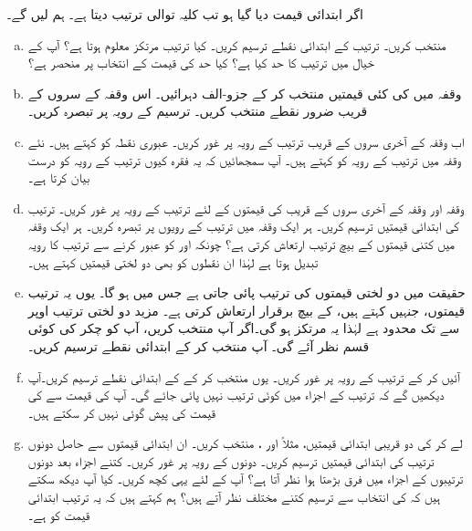 اگر ابتدائی قیمت  دیا گیا ہو تب کلیہ توالی  ترتیب  دیتا ہے۔  ہم  لیں گے۔
\begin{enumerate}[a.]
\item
{} منتخب کریں۔ ترتیب کے ابتدائی  نقطے  ترسیم کریں۔ کیا ترتیب مرتکز  معلوم ہوتا ہے؟ آپ کے خیال میں ترتیب کا حد کیا ہے؟ کیا حد کی قیمت  کے انتخاب پر منحصر ہے؟
\item
وقفہ  میں  کی کئی قیمتیں منتخب کر کے جزو-الف دہرائیں۔ اس وقفہ کے سروں کے قریب ضرور نقطے منتخب کریں۔ ترسیم کے رویہ پر تبصرہ کریں۔
\item
اب وقفہ  کے آخری سروں کے قریب ترتیب کے رویہ پر غور کریں۔ عبوری نقطہ  کو   کہتے ہیں۔ نئے وقفہ میں ترتیب کے رویہ کو   کہتے ہیں۔ آپ سمجھائیں کہ یہ فقرہ کیوں ترتیب کے رویہ کو درست بیان کرتا ہے۔
\item
وقفہ  اور وقفہ  کے آخری سروں کے قریب   کی قیمتوں کے لئے ترتیب کے رویہ پر غور کریں۔ ترتیب کی ابتدائی  قیمتیں ترسیم کریں۔ ہر ایک وقفہ میں ترتیب کے رویوں پر تبصرہ کریں۔ ہر ایک وقفہ میں کتنی قیمتوں کے بیچ ترتیب  ارتعاش کرتی ہے؟ چونکہ   اور  کو عبور کرنے سے ترتیب کا رویہ تبدیل ہوتا ہے لہٰذا ان نقطوں کو بھی دو لختی قیمتیں کہتے ہیں۔ 
\item
حقیقت میں دو لختی قیمتوں کی ترتیب  پائی جاتی ہے جس میں  ہو گا۔ یوں یہ ترتیب  قیمتوں، جنہیں  کہتے ہیں، کے بیچ برقرار ارتعاش کرتی ہے۔ مزید دو لختی ترتیب  اوپر سے  تک محدود ہے لہٰذا یہ مرتکز ہو گی۔اگر آپ  منتخب کریں، آپ کو  چکر کی کوئی قسم نظر آئے گی۔ آپ  منتخب کر کے ابتدائی  نقطے ترسیم کریں۔
\item
آئیں  کر کے ترتیب کے رویہ پر غور کریں۔ یوں  منتخب کر کے  کے ابتدائی  نقطے ترسیم کریں۔آپ دیکھیں گے کہ ترتیب کے اجزاء میں کوئی ترتیب نہیں پائی جائے گی۔ آپ  کی قیمت سے  کی قیمت کی پیش گوئی نہیں کر سکتے ہیں۔
\item
{} لے کر  کی دو قریبی ابتدائی قیمتیں، مثلاً  اور ، منتخب کریں۔ ان ابتدائی قیمتوں سے حاصل دونوں  ترتیب کی ابتدائی  قیمتیں ترسیم کریں۔ دونوں کے رویہ پر غور کریں۔ کتنے اجزاء بعد دونوں ترتیبوں کے اجزاء میں فرق بڑھتا ہوا نظر آتا ہے؟ آپ  کے لئے یہی کچھ کریں۔ کیا آپ دیکھ سکتے ہیں کہ  کی انتخاب سے ترسیم کتنے مختلف نظر آتے ہیں؟ ہم کہتے ہیں کہ یہ ترتیب ابتدائی قیمت کو  ہے۔
\end{enumerate}                                                    

